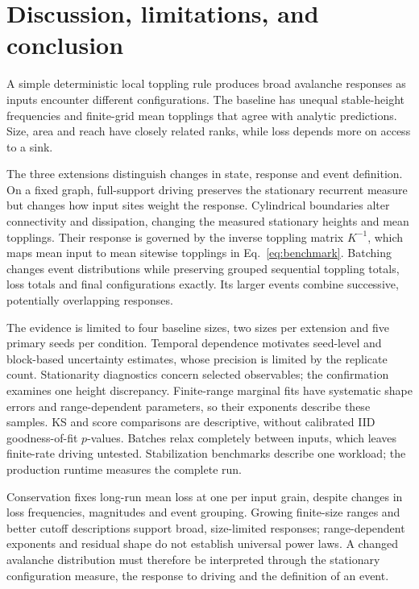 \chapter{Discussion, limitations, and conclusion}\label{sec:conclusion}
A simple deterministic local toppling rule produces broad avalanche responses as inputs encounter different configurations. The baseline has unequal stable-height frequencies and finite-grid mean topplings that agree with analytic predictions. Size, area and reach have closely related ranks, while loss depends more on access to a sink.

The three extensions distinguish changes in state, response and event definition. On a fixed graph, full-support driving preserves the stationary recurrent measure but changes how input sites weight the response. Cylindrical boundaries alter connectivity and dissipation, changing the measured stationary heights and mean topplings. Their response is governed by the inverse toppling matrix $K^{-1}$, which maps mean input to mean sitewise topplings in Eq.~\eqref{eq:benchmark}. Batching changes event distributions while preserving grouped sequential toppling totals, loss totals and final configurations exactly. Its larger events combine successive, potentially overlapping responses.

The evidence is limited to four baseline sizes, two sizes per extension and five primary seeds per condition. Temporal dependence motivates seed-level and block-based uncertainty estimates, whose precision is limited by the replicate count. Stationarity diagnostics concern selected observables; the confirmation examines one height discrepancy. Finite-range marginal fits have systematic shape errors and range-dependent parameters, so their exponents describe these samples. KS and score comparisons are descriptive, without calibrated IID goodness-of-fit $p$-values. Batches relax completely between inputs, which leaves finite-rate driving untested. Stabilization benchmarks describe one workload; the production runtime measures the complete run.

Conservation fixes long-run mean loss at one per input grain, despite changes in loss frequencies, magnitudes and event grouping. Growing finite-size ranges and better cutoff descriptions support broad, size-limited responses; range-dependent exponents and residual shape do not establish universal power laws. A changed avalanche distribution must therefore be interpreted through the stationary configuration measure, the response to driving and the definition of an event.

